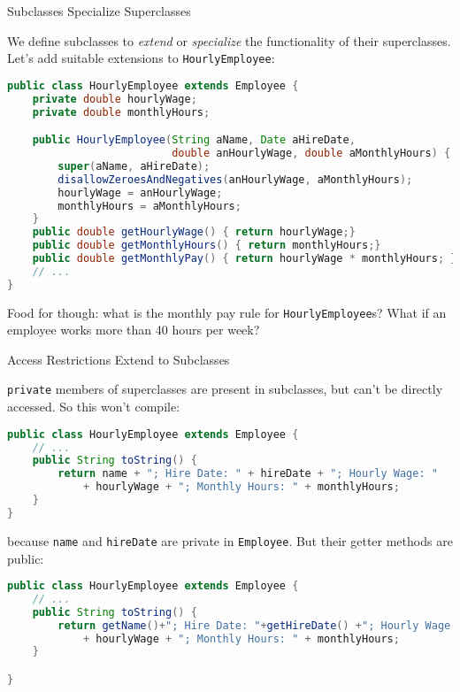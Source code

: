 \documentclass{beamer}
\begin{document}
\begin{frame}[fragile]{Subclasses Specialize Superclasses}


We define subclasses to {\it extend} or {\it specialize} the functionality of their superclasses.  Let's add suitable extensions to {\tt HourlyEmployee}:
\vspace{-.05in}
\begin{lstlisting}[language=Java]
public class HourlyEmployee extends Employee {
    private double hourlyWage;
    private double monthlyHours;

    public HourlyEmployee(String aName, Date aHireDate,
                          double anHourlyWage, double aMonthlyHours) {
        super(aName, aHireDate);
        disallowZeroesAndNegatives(anHourlyWage, aMonthlyHours);
        hourlyWage = anHourlyWage;
        monthlyHours = aMonthlyHours;
    }
    public double getHourlyWage() { return hourlyWage;}
    public double getMonthlyHours() { return monthlyHours;}
    public double getMonthlyPay() { return hourlyWage * monthlyHours; }
    // ...
}
\end{lstlisting}
\vspace{-.1in}
Food for though: what is the monthly pay rule for {\tt HourlyEmployee}s?  What if an employee works more than 40 hours per week?
\end{frame}

\begin{frame}[fragile]{Access Restrictions Extend to Subclasses}


{\tt private} members of superclasses are present in subclasses, but can't be directly accessed.  So this won't compile:
\vspace{-.05in}
\begin{lstlisting}[language=Java]
public class HourlyEmployee extends Employee {
    // ...
    public String toString() {
        return name + "; Hire Date: " + hireDate + "; Hourly Wage: "
            + hourlyWage + "; Monthly Hours: " + monthlyHours;
    }
}
\end{lstlisting}
because {\tt name} and {\tt hireDate} are private in {\tt Employee}.  But their getter methods are public:
\vspace{-.05in}
\begin{lstlisting}[language=Java]
public class HourlyEmployee extends Employee {
    // ...
    public String toString() {
        return getName()+"; Hire Date: "+getHireDate() +"; Hourly Wage: "
            + hourlyWage + "; Monthly Hours: " + monthlyHours;
    }

}
\end{lstlisting}


\end{frame}
\end{document}

